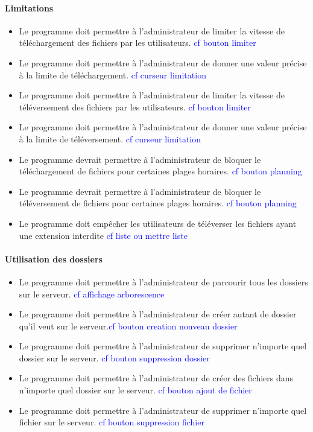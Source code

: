 \documentclass[10pt,a4paper]{report}
\begin{document}
\paragraph{Limitations}
	\begin{itemize}[label = $\triangleright$]
		\item Le programme doit permettre à l'administrateur de limiter la vitesse de téléchargement des fichiers par les utilisateurs. \textcolor{blue}{cf bouton limiter}
		\item Le programme doit permettre à l'administrateur de donner une valeur précise à la limite de téléchargement. \textcolor{blue}{cf curseur limitation}
		\item Le programme doit permettre à l'administrateur de limiter la vitesse de téléversement des fichiers par les utilisateurs. \textcolor{blue}{cf bouton limiter}
		\item Le programme doit permettre à l'administrateur de donner une valeur précise à la limite de téléversement. \textcolor{blue}{cf curseur limitation}
		\item Le programme devrait permettre à l'administrateur de bloquer le téléchargement de fichiers pour certaines plages horaires. \textcolor{blue}{cf bouton planning}
		\item Le programme devrait permettre à l'administrateur de bloquer le téléversement de fichiers pour certaines plages horaires. \textcolor{blue}{cf bouton planning}
		\item Le programme doit empêcher les utilisateurs de téléverser les fichiers ayant une extension interdite \textcolor{blue}{cf liste ou mettre liste}
	\end{itemize}
	
\paragraph{Utilisation des dossiers}
	\begin{itemize}[label = $\triangleright$]
		\item Le programme doit permettre à l'administrateur de parcourir tous les dossiers sur le serveur. \textcolor{blue}{cf affichage arborescence}
		\item Le programme doit permettre à l'administrateur de créer autant de dossier qu'il veut sur le serveur.\textcolor{blue}{cf bouton creation nouveau dossier}
		\item Le programme doit permettre à l'administrateur de supprimer n'importe quel dossier sur le serveur. \textcolor{blue}{cf bouton suppression dossier}
		\item Le programme doit permettre à l'administrateur de créer des fichiers dans n'importe quel dossier sur le serveur. \textcolor{blue}{cf bouton ajout de fichier}
		\item Le programme doit permettre à l'administrateur de supprimer n'importe quel fichier sur le serveur. \textcolor{blue}{cf bouton suppression fichier}
	\end{itemize}
	
\end{document}
